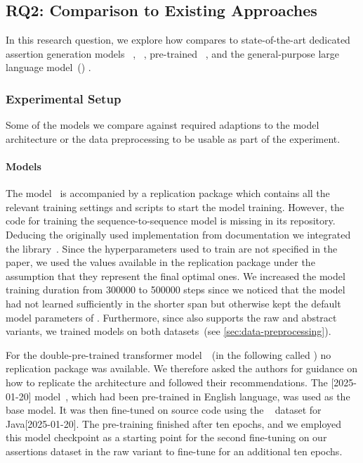 
\subsection{RQ2: Comparison to Existing
Approaches}\label{sec:rq-comparison}

In this research question, we explore how \assertfive compares to
state-of-the-art dedicated assertion generation models
\atlas~\cite{Watson2020}, \toga~\cite{Dinella2022}, pre-trained
\bart~\cite{Tufano2022}, and the general-purpose large language
model~(\llm) \gptfourmini.


\subsubsection{Experimental Setup}



Some of the models we compare against required adaptions to the model
architecture or the data preprocessing to be usable as part of the
experiment.


\paragraph{Models}

The \atlas model~\cite{Watson2020} is accompanied by a replication
package %
which contains all the relevant training settings and scripts to start
the model training.
However, the code for training the sequence-to-sequence model is
missing in its repository. Deducing the originally used implementation
from documentation we integrated the \seqtoseq
library~\cite{Britz2017}.
Since the hyperparameters used to train \atlas are not specified in
the paper, we used the values available in the replication package
under the assumption that they represent the final optimal ones.
We increased the model training duration from \num{300000} to
\num{500000} steps since we noticed that the model had not learned
sufficiently in the shorter span but otherwise kept the default model
parameters of \atlas.
Furthermore, since \atlas also supports the raw and abstract variants,
we trained models on both datasets~(see
\cref{sec:data-preprocessing}).

For the double-pre-trained \bart transformer
model~\cite{Tufano2022}~(in the following called \doprebart) no
replication package was available.
We therefore asked the authors %
for guidance on
how to replicate the architecture and followed their recommendations.
The
\bart{}[2025-01-20]
model~\cite{Lewis2020}, which had been pre-trained in English
language, was used as the base model. It was then fine-tuned on source
code using the \codesearchnet~\cite{Husain2019} dataset for
Java[2025-01-20].
The pre-training finished after ten epochs, and we employed this
model checkpoint as a starting point for the second fine-tuning on our
assertions dataset in the raw variant to fine-tune for an additional
ten epochs.

